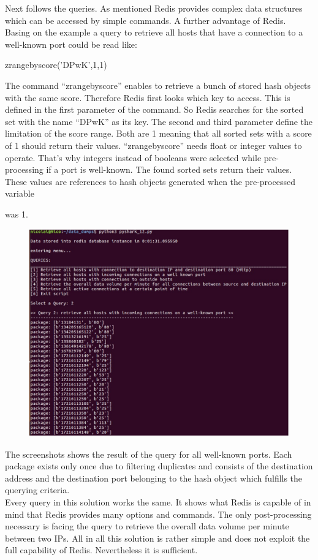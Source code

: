 Next follows the queries. As mentioned Redis provides complex data structures which can be accessed by simple commands. A further advantage of Redis. Basing on the example a query to retrieve all hosts that have a connection to a well-known port could be read like:\\

\begin{center}
zrangebyscore('DPwK',1,1)\\
\end{center}

The command “zrangebyscore” enables to retrieve a bunch of stored hash objects with the same score. Therefore Redis first looks which key to access. This is defined in the first parameter of the command. So Redis searches for the sorted set with the name “DPwK” as its key. The second and third parameter define the limitation of the score range. Both are 1 meaning that all sorted sets with a score of 1 should return their values. “zrangebyscore” needs float or integer values to operate. That’s why integers instead of booleans were selected while pre-processing if a port is well-known. The found sorted sets return their values. These values are references to hash objects generated when the pre-processed variable  was 1. 

\begin{figure}[H]
	\centerline{\includegraphics[width=1.0\textwidth]{resources/solution3-3.png}}
\end{figure}

The screenshots shows the result of the query for all well-known ports. Each package exists only once due to filtering duplicates and consists of the destination address and the destination port belonging to the hash object which fulfills the querying criteria.\\
Every query in this solution works the same. It shows what Redis is capable of in mind that Redis provides many options and commands. The only post-processing necessary is facing the query to retrieve the overall data volume per minute between two IPs. All in all this solution is rather simple and does not exploit the full capability of Redis. Nevertheless it is sufficient.
